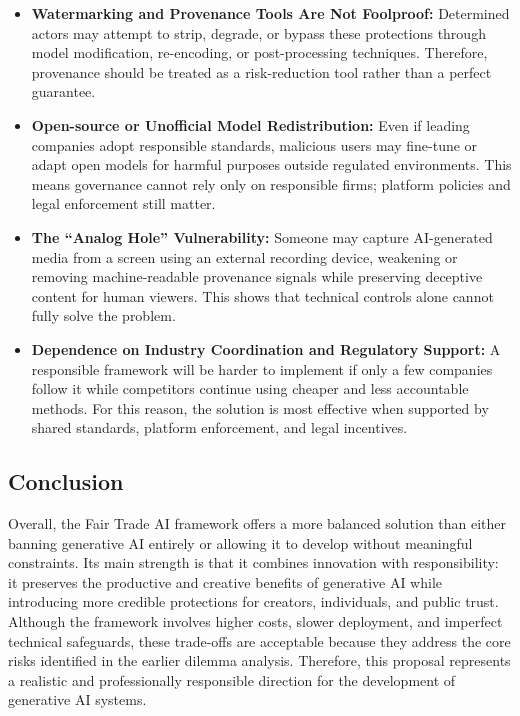 \begin{itemize}
    \item \textbf{Watermarking and Provenance Tools Are Not Foolproof:} Determined actors may attempt to strip, degrade, or bypass these protections through model modification, re-encoding, or post-processing techniques. Therefore, provenance should be treated as a risk-reduction tool rather than a perfect guarantee.

    \item \textbf{Open-source or Unofficial Model Redistribution:} Even if leading companies adopt responsible standards, malicious users may fine-tune or adapt open models for harmful purposes outside regulated environments. This means governance cannot rely only on responsible firms; platform policies and legal enforcement still matter.

    \item \textbf{The ``Analog Hole'' Vulnerability:} Someone may capture AI-generated media from a screen using an external recording device, weakening or removing machine-readable provenance signals while preserving deceptive content for human viewers. This shows that technical controls alone cannot fully solve the problem.

    \item \textbf{Dependence on Industry Coordination and Regulatory Support:} A responsible framework will be harder to implement if only a few companies follow it while competitors continue using cheaper and less accountable methods. For this reason, the solution is most effective when supported by shared standards, platform enforcement, and legal incentives.
\end{itemize}

\subsection{Conclusion}
Overall, the Fair Trade AI framework offers a more balanced solution than either banning generative AI entirely or allowing it to develop without meaningful constraints. Its main strength is that it combines innovation with responsibility: it preserves the productive and creative benefits of generative AI while introducing more credible protections for creators, individuals, and public trust. \\

Although the framework involves higher costs, slower deployment, and imperfect technical safeguards, these trade-offs are acceptable because they address the core risks identified in the earlier dilemma analysis. Therefore, this proposal represents a realistic and professionally responsible direction for the development of generative AI systems.